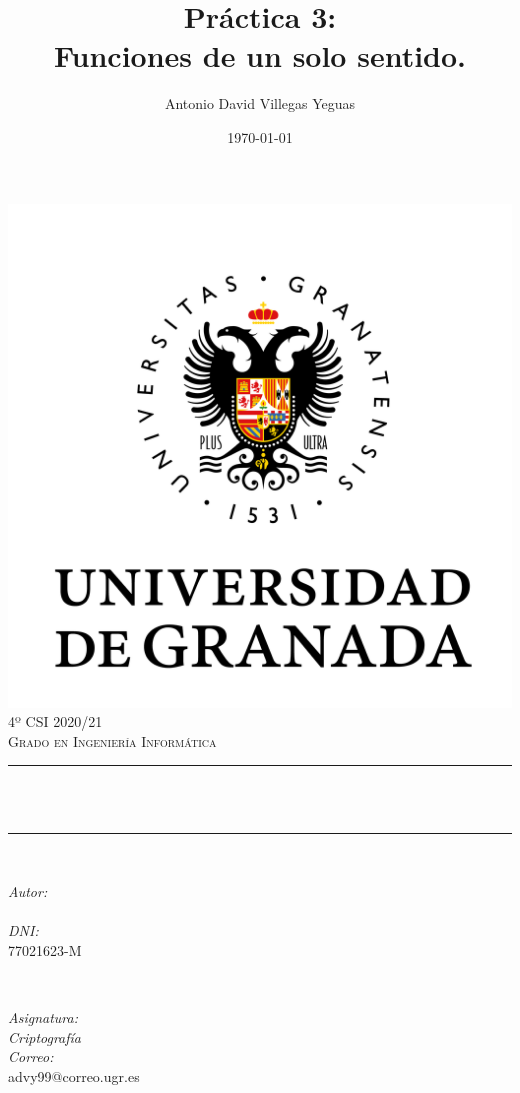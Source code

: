 \documentclass[12pt, spanish]{article}
\title{Práctica 3:\\
Funciones de un solo sentido.\hspace{0.05cm} }
\author{Antonio David Villegas Yeguas}
\date{\today}
\makeatletter
\let\thetitle\@title
\let\theauthor\@author
\makeatother
\begin{document}

\begin{titlepage}
    \centering
    \vspace*{0.3 cm}
    \includegraphics[scale = 0.50]{ugr.png}\\[0.7 cm]
    \textsc{\large 4º CSI 2020/21}\\[0.5 cm]
    \textsc{\large Grado en Ingeniería Informática}\\[0.5 cm]
    \rule{\linewidth}{0.2 mm} \\[0.2 cm]
    { \huge \bfseries \thetitle}\\
    \rule{\linewidth}{0.2 mm} \\[1 cm]

    \begin{minipage}{0.4\textwidth}
        \begin{flushleft} \large
            \emph{Autor:}\\
            \theauthor\\
			 \emph{DNI:}\\
            77021623-M
            \end{flushleft}
            \end{minipage}~
            \begin{minipage}{0.4\textwidth}
            \begin{flushright} \large
            \emph{Asignatura: \\
            Criptografía}   \\
            \emph{Correo:}\\
            advy99@correo.ugr.es
        \end{flushright}
    \end{minipage}\\[0.5cm]


\end{titlepage}
\end{document}
